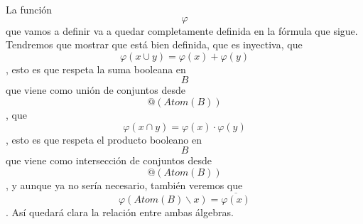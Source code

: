 \documentclass[
]{article}
\begin{document}
\begin{enumerate}
\begin{enumerate}
\begin{enumerate}
      La función \[\varphi\]que vamos a definir va a quedar
      completamente definida en la fór\-mula que sigue. Tendremos que
      mostrar que está bien definida, que es inyectiva, que
      \[\varphi{{({x \cup y})} = \varphi}{{(x)} + \varphi}{(y)}\], esto
      es que respeta la suma booleana en \[B\]que viene como unión de
      conjuntos desde \[@\left( {\mathit{Atom}{(B)}} \right)\], que
      \[\varphi{{({x \cap y})} = \varphi}{{(x)} \cdot \varphi}{(y)}\],
      esto es que respeta el producto booleano en \[B\]que viene como
      intersección de conjun\-tos desde
      \[@\left( {\mathit{Atom}{(B)}} \right)\] , y aunque ya no sería
      necesario, también veremos que
      \[\varphi{\left( {\mathit{Atom}{{(B)} \smallsetminus x}} \right) = \overline{\varphi(x)}}\]
      . Así quedará clara la relación entre ambas álgebras.


\end{enumerate}
\end{enumerate}
\end{enumerate}
\end{document}
